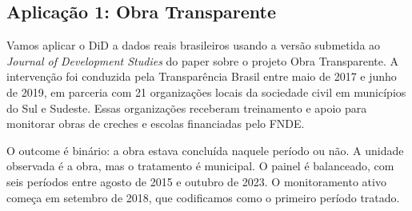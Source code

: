 \documentclass[
]{article}
\begin{document}
\subsection{Aplicação 1: Obra Transparente}\label{aplicauxe7uxe3o-1-obra-transparente}

Vamos aplicar o DiD a dados reais brasileiros usando a versão submetida ao \emph{Journal of Development Studies} do paper sobre o projeto Obra Transparente. A intervenção foi conduzida pela Transparência Brasil entre maio de 2017 e junho de 2019, em parceria com 21 organizações locais da sociedade civil em municípios do Sul e Sudeste. Essas organizações receberam treinamento e apoio para monitorar obras de creches e escolas financiadas pelo FNDE.

O outcome é binário: a obra estava concluída naquele período ou não. A unidade observada é a obra, mas o tratamento é municipal. O painel é balanceado, com seis períodos entre agosto de 2015 e outubro de 2023. O monitoramento ativo começa em setembro de 2018, que codificamos como o primeiro período tratado.
\end{document}
